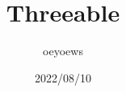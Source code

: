 \documentclass{article}
\title{Threeable}
\author{oeyoews}
\date{2022/08/10}
\begin{document}
\maketitle


\section{}%
\label{}
\end{document}
